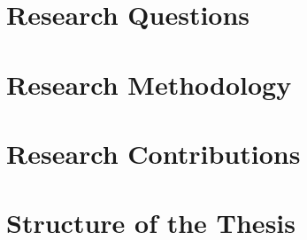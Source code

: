 \section{Research Questions}

\section{Research Methodology}

\section{Research Contributions}

\section{Structure of the Thesis}

